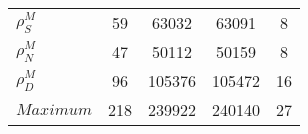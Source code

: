 \begin{center}
\begin{longtable}{lcccc}
$ {\rho^{M}_{S}}       $	 & 	                   59	 & 	                63032	 & 	                63091	 & 	                    8 \\ 
$ {\rho^{M}_{N}}       $	 & 	                   47	 & 	                50112	 & 	                50159	 & 	                    8 \\ 
$ {\rho^{M}_{D}}       $	 & 	                   96	 & 	               105376	 & 	               105472	 & 	                   16 \\ 
$Maximum               $	 & 	                  218	 & 	               239922	 & 	               240140	 & 	                   27 \\ 
\end{longtable}
 \end{center}

